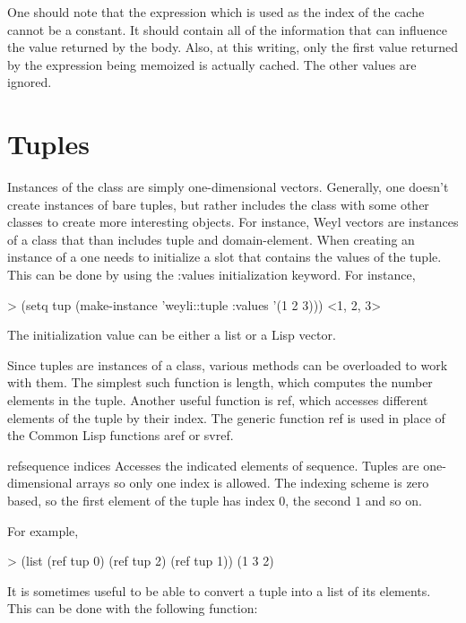 One should note that the expression which is used as the index of the
cache cannot be a constant.  It should contain all of the information
that can influence the value returned by the body.  Also, at this
writing, only the first value returned by the expression being
memoized is actually cached. The other values are ignored.
  

\section{Tuples}
  
Instances of the class  are simply
one-dimensional vectors. Generally, one doesn't create instances of
bare tuples, but rather includes the  class with
some other classes to create more interesting objects. For instance,
Weyl vectors are instances of a class that than includes tuple and
domain-element.  When creating an instance of a 
one needs to initialize a slot that contains the values of the tuple.
This can be done by using the {\sf :values} initialization keyword.
For instance,
\begin{code}
> (setq tup (make-instance 'weyli::tuple :values '(1 2 3)))
<1, 2, 3>
\end{code}
  
\noindent
The initialization value can be either a list or a Lisp vector.
  
Since tuples are instances of a class, various methods can be
overloaded to work with them. The simplest such function is {\sf
length}, which computes the number elements in the tuple. Another
useful function is {\sf ref}, which accesses different elements of the
tuple by their index.  The generic function {\sf ref} is used in place
of the Common Lisp functions {\sf aref} or {\sf svref}.
  
\begin{macrodef}{ref}{sequence \rest indices}
Accesses the indicated elements of sequence. Tuples
are one-dimensional arrays so only one index is allowed.
The indexing scheme is zero based, so the first element
of the tuple has index $0$, the second $1$ and so on.
  
For example,
\begin{code}
> (list (ref tup 0) (ref tup 2) (ref tup 1))
(1 3 2)
\end{code}
\end{macrodef}  

It is sometimes useful to be able to convert a tuple into a list of
its elements. This can be done with the following function:
  
